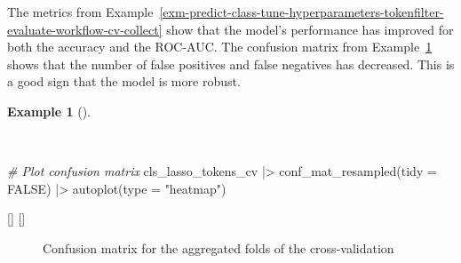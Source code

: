 \documentclass[
  letterpaper,
  krantz1]{latex/krantz-mod}
\newenvironment{Shaded}{\begin{snugshade}}{\end{snugshade}}
\newcommand{\AttributeTok}[1]{\textcolor[rgb]{0.00,0.00,0.00}{#1}}
\newcommand{\CommentTok}[1]{\textcolor[rgb]{0.00,0.00,0.00}{\textit{#1}}}
\newcommand{\ConstantTok}[1]{\textcolor[rgb]{0.00,0.00,0.00}{#1}}
\newcommand{\FunctionTok}[1]{\textcolor[rgb]{0.00,0.00,0.00}{#1}}
\newcommand{\NormalTok}[1]{\textcolor[rgb]{0.00,0.00,0.00}{#1}}
\newcommand{\SpecialCharTok}[1]{\textcolor[rgb]{0.00,0.00,0.00}{#1}}
\newcommand{\StringTok}[1]{\textcolor[rgb]{0.00,0.00,0.00}{#1}}
\newcommand{\cindex}[1]{%
  \StrSubstitute{#1}{_}{\_}[\temp]%
  \index{\temp}%
}
\theoremstyle{definition}
\theoremstyle{definition}
\newtheorem{example}{Example}[chapter]
\theoremstyle{remark}
\begin{document}
The metrics from
Example~\ref{exm-predict-class-tune-hyperparameters-tokenfilter-evaluate-workflow-cv-collect}
show that the model's performance has improved for both the
accuracy and the
ROC-AUC.
The confusion matrix from
Example~\ref{exm-predict-class-tune-hyperparameters-tokenfilter-evaluate-workflow-cv-confusion}
shows that the number of false positives and false negatives has
decreased. This is a good sign that the model is more robust.

\begin{example}[]\protect\hypertarget{exm-predict-class-tune-hyperparameters-tokenfilter-evaluate-workflow-cv-confusion}{}\label{exm-predict-class-tune-hyperparameters-tokenfilter-evaluate-workflow-cv-confusion}

~

\begin{Shaded}
\begin{Highlighting}[numbers=left,,]
\CommentTok{\# Plot confusion matrix}
\NormalTok{cls\_lasso\_tokens\_cv }\SpecialCharTok{|\textgreater{}}
  \FunctionTok{conf\_mat\_resampled}\NormalTok{(}\AttributeTok{tidy =} \ConstantTok{FALSE}\NormalTok{) }\SpecialCharTok{|\textgreater{}}
  \FunctionTok{autoplot}\NormalTok{(}\AttributeTok{type =} \StringTok{"heatmap"}\NormalTok{)}
\end{Highlighting}
\end{Shaded}

\cindex{conf_mat_resampled()}\cindex{autoplot()}

\end{example}

\begin{figure}[!htb]


\caption{\label{fig-predict-class-tune-hyperparameters-tokenfilter-evaluate-workflow-cv-confusion}Confusion
matrix for the aggregated folds of the cross-validation}

\end{figure}%
\end{document}
